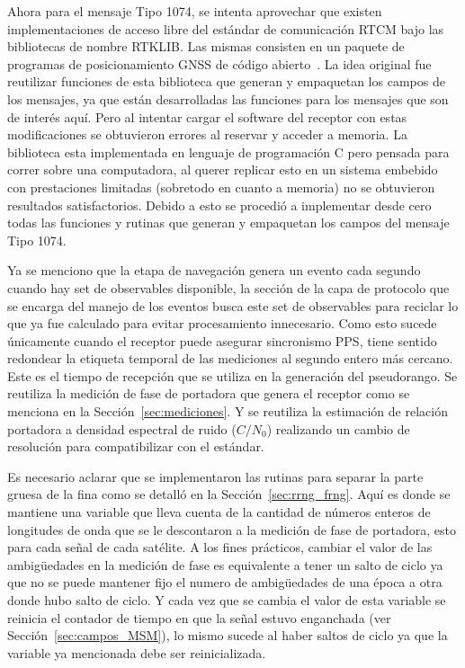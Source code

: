 \documentclass[a4paper,12pt,oneside,onecolumn,final,openright]{book}%
\begin{document}
	Ahora para el mensaje Tipo 1074, se intenta aprovechar que existen implementaciones de acceso libre del estándar de comunicación RTCM bajo las bibliotecas de nombre RTKLIB. Las mismas consisten en un paquete de programas de posicionamiento GNSS de código abierto~\cite{rtklib}. La idea original fue reutilizar funciones de esta biblioteca que generan y empaquetan los campos de los mensajes, ya que están desarrolladas las funciones para los mensajes que son de interés aquí. Pero al intentar cargar el software del receptor con estas modificaciones se obtuvieron errores al reservar y acceder a memoria. La biblioteca esta implementada en lenguaje de programación C pero pensada para correr sobre una computadora, al querer replicar esto en un sistema embebido con prestaciones limitadas (sobretodo en cuanto a memoria) no se obtuvieron resultados satisfactorios. Debido a esto se procedió a implementar desde cero todas las funciones y rutinas que generan y empaquetan los campos del mensaje Tipo 1074.
	
	Ya se menciono que la etapa de navegación genera un evento cada segundo cuando hay set de observables disponible, la sección de la capa de protocolo que se encarga del manejo de los eventos busca este set de observables para reciclar lo que ya fue calculado para evitar procesamiento innecesario. Como esto sucede únicamente cuando el receptor puede asegurar sincronismo PPS, tiene sentido redondear la etiqueta temporal de las mediciones al segundo entero más cercano. Este es el tiempo de recepción que se utiliza en la generación del pseudorango. Se reutiliza la medición de fase de portadora que genera el receptor como se menciona en la Sección~\ref{sec:mediciones}. Y se reutiliza la estimación de relación portadora a densidad espectral de ruido ($C/N_0$) realizando un cambio de resolución para compatibilizar con el estándar.
	
	 Es necesario aclarar que se implementaron las rutinas para separar la parte gruesa de la fina como se detalló en la Sección~\ref{sec:rrng_frng}. Aquí es donde se mantiene una variable que lleva cuenta de la cantidad de números enteros de longitudes de onda que se le descontaron a la medición de fase de portadora, esto para cada señal de cada satélite. A los fines prácticos, cambiar el valor de las ambigüedades en la medición de fase es equivalente a tener un salto de ciclo ya que no se puede mantener fijo el numero de ambigüedades de una época a otra donde hubo salto de ciclo. Y cada vez que se cambia el valor de esta variable se reinicia el contador de tiempo en que la señal estuvo enganchada (ver Sección~\ref{sec:campos_MSM}), lo mismo sucede al haber saltos de ciclo ya que la variable ya mencionada debe ser reinicializada.
	
\end{document}
